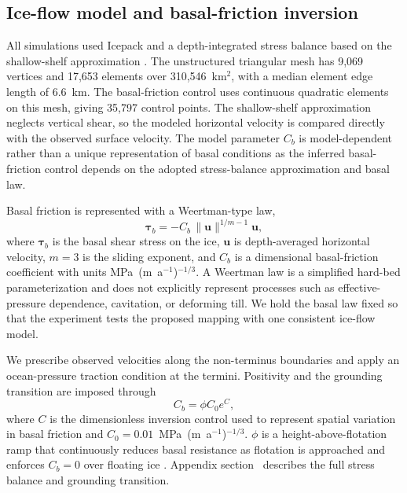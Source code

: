 \documentclass[review,jog]{igs}
\begin{document}
\subsection{Ice-flow model and basal-friction inversion}

All simulations used Icepack \citep{shapero2021icepack} and a depth-integrated stress balance based on the shallow-shelf approximation \citep{macayeal1989large}. The unstructured triangular mesh has 9,069 vertices and 17,653 elements over 310,546~km$^2$, with a median element edge length of 6.6~km. The basal-friction control uses continuous quadratic elements on this mesh, giving 35,797 control points. The shallow-shelf approximation neglects vertical shear, so the modeled horizontal velocity is compared directly with the observed surface velocity. The model parameter $C_b$ is model-dependent rather than a unique representation of basal conditions as the inferred basal-friction control depends on the adopted stress-balance approximation and basal law.

Basal friction is represented with a Weertman-type law,
\begin{equation}
\label{eq:weertman}
\boldsymbol{\tau}_b=-C_b\,\lVert\mathbf{u}\rVert^{1/m-1}\mathbf{u},
\end{equation}
where $\boldsymbol{\tau}_b$ is the basal shear stress on the ice, $\mathbf{u}$ is depth-averaged horizontal velocity, $m=3$ is the sliding exponent, and $C_b$ is a dimensional basal-friction coefficient with units MPa~(m~a$^{-1}$)$^{-1/3}$. A Weertman law is a simplified hard-bed parameterization and does not explicitly represent processes such as effective-pressure dependence, cavitation, or deforming till. We hold the basal law fixed so that the experiment tests the proposed mapping with one consistent ice-flow model.

We prescribe observed velocities along the non-terminus boundaries and apply an ocean-pressure traction condition at the termini. Positivity and the grounding transition are imposed through
\begin{equation}
\label{eq:friction_parameterization}
C_b=\phi C_0 e^{C},
\end{equation}
where $C$ is the dimensionless inversion control used to represent spatial variation in basal friction and $C_0=0.01$~MPa~(m~a$^{-1}$)$^{-1/3}$. $\phi$ is a height-above-flotation ramp that continuously reduces basal resistance as flotation is approached and enforces $C_b=0$ over floating ice \citep{leguy2014parameterization,seroussi2014hydrostatic}. Appendix section~ describes the full stress balance and grounding transition. 
\end{document}
